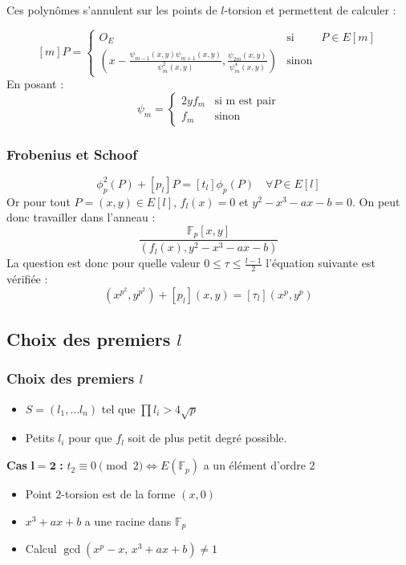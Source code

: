 \documentclass{beamer}
\begin{document}
\begin{frame}
Ces polynômes s'annulent sur les points de $l$-torsion et permettent de calculer :

\begin{equation}\label{mP}
[m]P = \left\lbrace
\begin{array}{lll}
O_E & \mbox{si} & P \in E[m]  \\
\left(  x -   \frac{\psi_{m-1}(x,y)\psi_{m+1}(x,y)}{\psi^2_m(x,y)}, \frac{\psi_{2m}(x,y)}{\psi^4_m(x,y)}\right) & \mbox{sinon}  & 
\end{array}\right.
\end{equation}
En posant : 
\begin{equation*}
\psi_m= \left\lbrace
\begin{array}{cc}
2yf_m & \mbox{si m est pair} \\
f_m & \mbox{sinon}
\end{array}\right.
\end{equation*} 
\end{frame}


\begin{frame}
\frametitle{Frobenius et Schoof}
\begin{equation}
\label{eqnfrobenius}
\phi_p^2(P)  + [p_l]P = [t_{l}] \phi_p(P) \quad \forall P \in E[l]
\end{equation} 
Or pour tout $P=(x,y) \in E[l]$, $f_l(x) = 0$ et $y^2 - x^3 -ax -b=0$. 
\newline
On peut donc travailler dans l'anneau : 
$$ \frac{\mathbb{F}_p[x,y]}{(f_l(x), y^2 - x^3 -ax -b)} $$ 
La question est donc pour quelle valeur $0 \leq \tau \leq \frac{l-1}{2}$ l'équation suivante est vérifiée :
\begin{equation}
(x^{p^2}, y^{p^2}) + [p_l](x,y) = [\tau_l](x^{p}, y^{p})
\end{equation}
\end{frame}

\subsection{Choix des premiers $l$}
\begin{frame}
\frametitle{Choix des premiers $l$}
\begin{itemize}
\item $S = (l_1, \ldots l_n)$ tel que $\prod l_i > 4\sqrt{p}$
\item Petits $l_i$ pour que $f_l$ soit de plus petit degré possible.
\end{itemize}

 
\textbf{Cas} $\mathbf{l=2}$ \textbf{:} $t_2 \equiv 0 \pmod 2 \Leftrightarrow E(\mathbb{F}_p)$ a un élément d'ordre $2$
\begin{itemize}
\item Point $2$-torsion est de la forme $(x,0)$
\item $x^3 +ax +b$ a une racine dans $\mathbb{F}_p$
\item Calcul $\gcd(x^p - x,\, x^3 +ax +b) \ne 1$
\end{itemize}
\end{frame}
\end{document}
